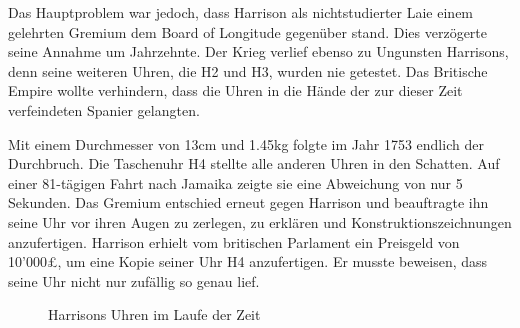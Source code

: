 \begin{refsection}
Das Hauptproblem war jedoch, dass Harrison als nichtstudierter Laie einem gelehrten Gremium dem Board of Longitude gegenüber stand. Dies verzögerte seine Annahme um Jahrzehnte. Der Krieg verlief ebenso zu Ungunsten Harrisons, denn seine weiteren Uhren, die H2 und H3, wurden nie getestet. Das Britische Empire wollte verhindern, dass die Uhren in die Hände der zur dieser Zeit verfeindeten Spanier gelangten.

Mit einem Durchmesser von 13cm und 1.45kg folgte im Jahr 1753 endlich der Durchbruch.
Die Taschenuhr H4 stellte alle anderen Uhren in den Schatten. Auf einer 81-tägigen Fahrt nach Jamaika zeigte sie eine Abweichung von nur 5 Sekunden.
Das Gremium entschied erneut gegen Harrison und beauftragte ihn seine Uhr vor ihren Augen zu zerlegen, zu erklären und Konstruktionszeichnungen anzufertigen.
Harrison erhielt vom britischen Parlament ein Preisgeld von 10’000£, um eine Kopie seiner Uhr H4 anzufertigen. Er musste beweisen, dass seine Uhr nicht nur zufällig so genau lief.
\begin{figure}[!htb]
\centering
\quad \quad
\centering
\quad \quad
\centering
\caption{Harrisons Uhren im Laufe der Zeit} 
\end{figure}


\end{refsection}
